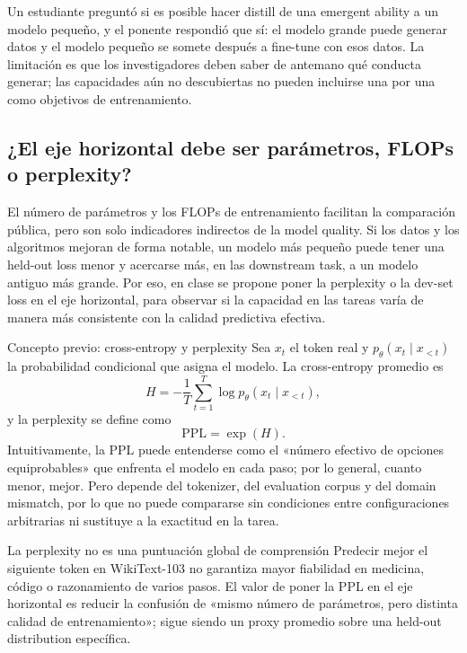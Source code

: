 Un estudiante preguntó si es posible hacer distill de una emergent ability a un modelo pequeño, y el ponente respondió que sí: el modelo grande puede generar datos y el modelo pequeño se somete después a fine-tune con esos datos. La limitación es que los investigadores deben saber de antemano qué conducta generar; las capacidades aún no descubiertas no pueden incluirse una por una como objetivos de entrenamiento.

\subsection{¿El eje horizontal debe ser parámetros, FLOPs o perplexity?}

El número de parámetros y los FLOPs de entrenamiento facilitan la comparación pública, pero son solo indicadores indirectos de la model quality. Si los datos y los algoritmos mejoran de forma notable, un modelo más pequeño puede tener una held-out loss menor y acercarse más, en las downstream task, a un modelo antiguo más grande. Por eso, en clase se propone poner la perplexity o la dev-set loss en el eje horizontal, para observar si la capacidad en las tareas varía de manera más consistente con la calidad predictiva efectiva.


\begin{knowledgebox}{Concepto previo: cross-entropy y perplexity}
Sea $x_t$ el token real y $p_\theta(x_t\mid x_{<t})$ la probabilidad condicional que asigna el modelo. La cross-entropy promedio es
\[
H=-\frac{1}{T}\sum_{t=1}^{T}\log p_\theta(x_t\mid x_{<t}),
\]
y la perplexity se define como
\[
\mathrm{PPL}=\exp(H).
\]
Intuitivamente, la PPL puede entenderse como el «número efectivo de opciones equiprobables» que enfrenta el modelo en cada paso; por lo general, cuanto menor, mejor. Pero depende del tokenizer, del evaluation corpus y del domain mismatch, por lo que no puede compararse sin condiciones entre configuraciones arbitrarias ni sustituye a la exactitud en la tarea.
\end{knowledgebox}

\begin{warningbox}{La perplexity no es una puntuación global de comprensión}
Predecir mejor el siguiente token en WikiText-103 no garantiza mayor fiabilidad en medicina, código o razonamiento de varios pasos. El valor de poner la PPL en el eje horizontal es reducir la confusión de «mismo número de parámetros, pero distinta calidad de entrenamiento»; sigue siendo un proxy promedio sobre una held-out distribution específica.
\end{warningbox}

